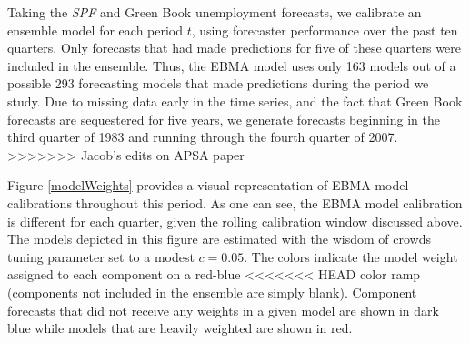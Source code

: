 \documentclass[12pt,fullpage,endnotes]{article}
\begin{document}
Taking the \textit{SPF} and Green Book unemployment forecasts, we
calibrate an ensemble model for each period $t$, using forecaster
performance over the past ten quarters.  Only forecasts that had made
predictions for five of these quarters were included in the ensemble.
Thus, the EBMA model uses only 163 models out of a possible 293
forecasting models that made predictions during the period we study.
Due to missing data early in the time series, and the fact that Green
Book forecasts are sequestered for five years, we generate forecasts
beginning in the third quarter of 1983 and running through the fourth
quarter of 2007.
>>>>>>> Jacob's edits on APSA paper

Figure \ref{modelWeights} provides a visual representation of EBMA
model calibrations throughout this period. As one can see, the EBMA model calibration is different for each quarter, given the rolling calibration window discussed above. The models depicted in this figure are estimated with the wisdom of crowds tuning parameter set to a modest $c=0.05$.  The colors
indicate the model weight assigned to each component on a red-blue
<<<<<<< HEAD
color ramp (components not included in the ensemble are simply blank).  Component forecasts that did not receive any weights in a given model are shown in dark blue while models that are
heavily weighted are shown in red.
\end{document}
